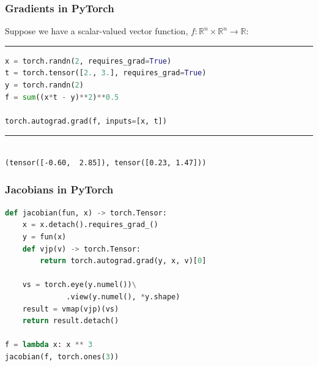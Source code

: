 \documentclass{beamer}
\begin{document}
    \begin{frame}[fragile]
        \frametitle{Gradients in PyTorch}

        Suppose we have a scalar-valued vector function, $f: \mathbb{R}^{n}\times\mathbb{R}^{n}\rightarrow\mathbb{R}$:

        \noindent\rule{\textwidth}{0.5pt}

        \begin{lstlisting}[language=Python]
x = torch.randn(2, requires_grad=True)
t = torch.tensor([2., 3.], requires_grad=True)
y = torch.randn(2)
f = sum((x*t - y)**2)**0.5

torch.autograd.grad(f, inputs=[x, t])
        \end{lstlisting}

        \noindent\rule{\textwidth}{0.5pt}
        \begin{lstlisting}

(tensor([-0.60,  2.85]), tensor([0.23, 1.47]))
        \end{lstlisting}

    \end{frame}

    \begin{frame}[fragile]
        \frametitle{Jacobians in PyTorch}
        \begin{lstlisting}[language=Python]
def jacobian(fun, x) -> torch.Tensor:
    x = x.detach().requires_grad_()
    y = fun(x)
    def vjp(v) -> torch.Tensor:
        return torch.autograd.grad(y, x, v)[0]

    vs = torch.eye(y.numel())\
              .view(y.numel(), *y.shape)
    result = vmap(vjp)(vs)
    return result.detach()

f = lambda x: x ** 3
jacobian(f, torch.ones(3))
        \end{lstlisting}
    \end{frame}
\end{document}
